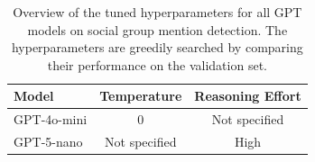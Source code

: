 \begin{table}[H]
\centering
\begin{tabular}{lcc}
\toprule
Model & Temperature & Reasoning Effort \\
\midrule
GPT-4o-mini & $0$ & Not specified \\
GPT-5-nano & Not specified & High \\
\bottomrule
\end{tabular}
\caption[Tuned hyperparameters for GPT models on social group mention detection]{Overview of the tuned hyperparameters for all GPT models on social group mention detection. The hyperparameters are greedily searched by comparing their performance on the validation set.}
\label{tab:tuned_hyperparams_genllm_group_detection}
\end{table}
